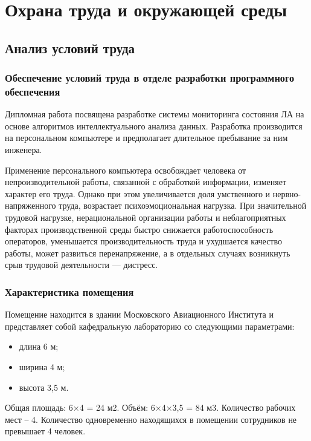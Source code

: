 \chapter{Охрана труда и окружающей среды}
\section{Анализ условий труда}
\subsection{Обеспечение условий труда в отделе разработки программного обеспечения}
Дипломная работа посвящена разработке системы мониторинга состояния ЛА на основе алгоритмов интеллектуального анализа данных. Разработка производится на персональном компьютере и предполагает длительное пребывание за ним инженера.

Применение персонального компьютера освобождает человека от непроизводительной работы, связанной с обработкой информации, изменяет характер его труда. Однако при этом увеличивается доля умственного и нервно-напряженного труда, возрастает психоэмоциональная нагрузка. При значительной трудовой нагрузке, нерациональной организации работы и неблагоприятных факторах производственной среды быстро снижается работоспособность операторов, уменьшается производительность труда и ухудшается качество работы, может развиться перенапряжение, а в отдельных случаях возникнуть срыв трудовой деятельности — дистресс.

\subsection{Характеристика помещения}
Помещение находится в здании Московского Авиационного Института и представляет собой кафедральную лабораторию со следующими параметрами:
\begin{itemize}
\item длина 6 м;
\item ширина 4 м;
\item высота 3,5 м.
\end{itemize}
Общая площадь: 6×4 = 24 м2.
Объём: 6×4×3,5 = 84 м3.
Количество рабочих мест – 4.
Количество одновременно находящихся в помещении сотрудников не превышает 4 человек.